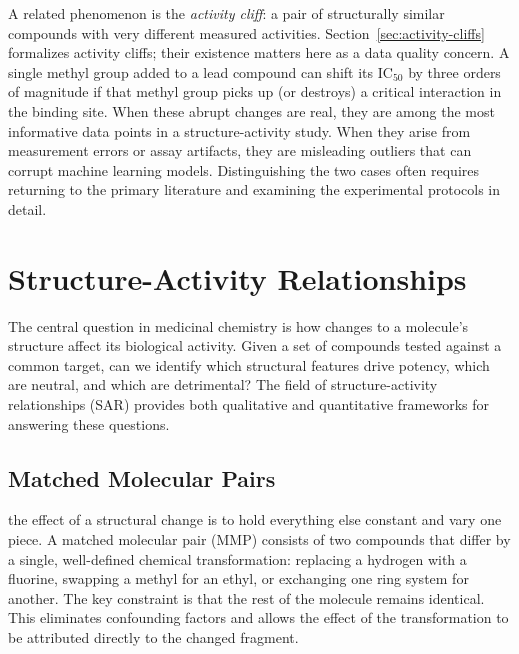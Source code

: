 A related phenomenon is the \emph{activity cliff}: a pair of structurally similar compounds with very different measured activities. Section~\ref{sec:activity-cliffs} formalizes activity cliffs; their existence matters here as a data quality concern. A single methyl group added to a lead compound can shift its IC$_{50}$ by three orders of magnitude if that methyl group picks up (or destroys) a critical interaction in the binding site. When these abrupt changes are real, they are among the most informative data points in a structure-activity study. When they arise from measurement errors or assay artifacts, they are misleading outliers that can corrupt machine learning models. Distinguishing the two cases often requires returning to the primary literature and examining the experimental protocols in detail.


\section{Structure-Activity Relationships}
\label{sec:sar}

The central question in medicinal chemistry is how changes to a molecule's structure affect its biological activity. Given a set of compounds tested against a common target, can we identify which structural features drive potency, which are neutral, and which are detrimental? The field of structure-activity relationships (SAR) provides both qualitative and quantitative frameworks for answering these questions.


\subsection{Matched Molecular Pairs}
\label{sec:mmps}

 the effect of a structural change is to hold everything else constant and vary one piece. A matched molecular pair (MMP) consists of two compounds that differ by a single, well-defined chemical transformation: replacing a hydrogen with a fluorine, swapping a methyl for an ethyl, or exchanging one ring system for another. The key constraint is that the rest of the molecule remains identical. This eliminates confounding factors and allows the effect of the transformation to be attributed directly to the changed fragment.

